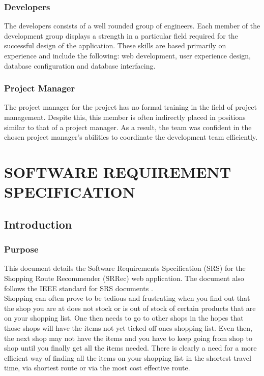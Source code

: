 \documentclass[10pt,twocolumn]{witseiepaper}
\begin{document}
		\subsubsection{Developers} The developers consists of a well rounded group of engineers. Each member of the development group displays a strength in a particular field required for the successful design of the application. These skills are based primarily on experience and include the following: web development, user experience design, database configuration and database interfacing.\\ 
		
		\subsubsection{Project Manager} The project manager for the project has no formal training in the field of project management. Despite this, this member is often indirectly placed in positions similar to that of a project manager. As a result, the team was confident in the chosen project manager's abilities to coordinate the development team efficiently. \\

\section{SOFTWARE REQUIREMENT SPECIFICATION}
	
	\subsection{Introduction}
		
		\subsubsection{Purpose}
		
			This document details the Software Requirements Specification (SRS) for the Shopping Route Recommender (SRRec) web application. The document also follows the IEEE standard for SRS documents \cite{ieee}.\\
			
			Shopping can often prove to be tedious and frustrating when you find out that the shop you are at does not stock or is out of stock of certain products that are on your shopping list. One then needs to go to other shops in the hopes that those shops will have the items not yet ticked off ones shopping list. Even then, the next shop may not have the items and you have to keep going from shop to shop until you finally get all the items needed. There is clearly a need for a more efficient way of finding all the items on your shopping list in the shortest travel time, via shortest route or via the most cost effective route.\\
			
\end{document}
